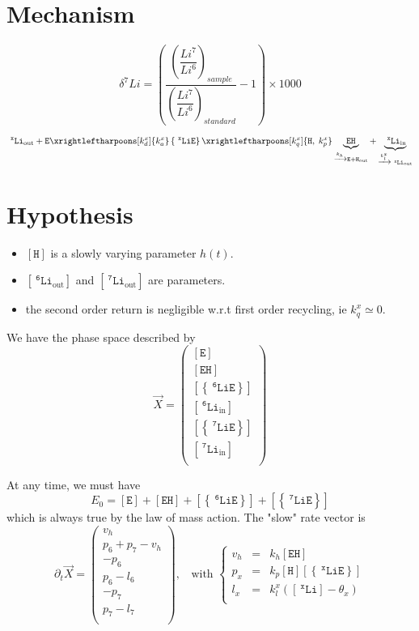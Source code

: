 \documentclass[aps,onecolumn,11pt]{revtex4}
\newcommand{\mychem}[1]{\mathtt{#1}}
\newcommand{\myconc}[1]{\left\lbrack{#1}\right\rbrack}
\newcommand{\spLi}[1]{{~^{\mychem{#1}}\mychem{Li}}}
\newcommand{\Li}[1]{\myconc{\spLi{#1}}}
\newcommand{\spEout}{\mychem{E}}
\newcommand{\Eout}{\myconc{\spEout}}
\newcommand{\spLiE}[1]{\left\lbrace\spLi{#1}\spEout\right\rbrace}
\newcommand{\LiE}[1]{\myconc{\spLiE{#1}}}
\newcommand{\spLiIn}[1]{{\spLi{#1}}_{\mathrm{in}}}
\newcommand{\LiIn}[1]{\myconc{\spLiIn{#1}}}
\newcommand{\spLiOut}[1]{{\spLi{#1}}_{\mathrm{out}}}
\newcommand{\LiOut}[1]{\myconc{\spLiOut{#1}}}
\newcommand{\spEHin}{\mychem{EH}}
\newcommand{\EHin}{\myconc{\spEHin}}
\newcommand{\spproton}{\mychem{H}}
\newcommand{\proton}{\myconc{\spproton}}
\begin{document}
\section{Mechanism}
$$
	\delta^7Li = \left(
		\dfrac{\left(\dfrac{Li^7}{Li^6}\right)_{sample}}
		{\left(\dfrac{Li^7}{Li^6}\right)_{standard}}
		 -1 
	\right) \times 1000
$$


\begin{equation}
	 \spLiOut{x} +  \spEout  
	 \xrightleftharpoons[k_d^x]{k_a^x} 
	 \spLiE{x}
	  \xrightleftharpoons[k_q^x]{\mychem{H},\;k_p^x} \underbrace{\spEHin}_{\xrightarrow[]{k_h} \mychem{E} + \mychem{H}_{\mathrm{out}}} + \underbrace{\spLiIn{x}}_{\xrightarrow[]{k_l^x} \spLiOut{x}}
\end{equation}

\section{Hypothesis}
\begin{itemize}
\item $\proton$ is a slowly varying parameter $h(t)$.
\item $\LiOut{6}$ and  $\LiOut{7}$ are parameters.
\item the second order return is negligible w.r.t first order recycling, ie $k_q^x\simeq0$.
\end{itemize}

We have the phase space described by
\begin{equation}
 \vec{X} = 
        \begin{pmatrix}
        \Eout\\
        \EHin\\
        \LiE{6}\\
        \LiIn{6}\\
        \LiE{7}\\
        \LiIn{7}\\
        \end{pmatrix}
\end{equation}

At any time, we must have
\begin{equation} 
	\label{eq:E0}
	E_0 = \Eout + \EHin +  \LiE{6} + \LiE{7}
\end{equation}
which is always true by the law of mass action.
The "slow" rate vector is
\begin{equation}
	\partial_t\vec{X} = 
	\begin{pmatrix}
		v_h\\
		p_6+p_7-v_h\\
		-p_6\\
		p_6-l_6\\
		-p_7\\
		p_7-l_7\\
	\end{pmatrix}
	,\;\;\text{ with }
	\left\lbrace
	\begin{array}{rcl}
	v_h & = & k_h \EHin\\
	p_x & = & k_p \proton \LiE{x}\\
	l_x & = & k_l^x \left(\Li{x}-\theta_x\right)\\
	\end{array}
	\right.
\end{equation}
\end{document}
